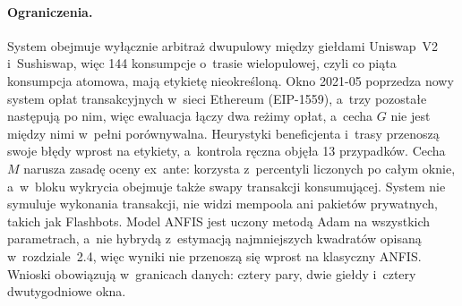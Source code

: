\paragraph{Ograniczenia.} System obejmuje wyłącznie arbitraż dwupulowy między giełdami
Uniswap~V2 i~Sushiswap, więc 144 konsumpcje o~trasie wielopulowej, czyli co piąta konsumpcja
atomowa, mają etykietę nieokreśloną. Okno 2021-05 poprzedza nowy system opłat transakcyjnych
w~sieci Ethereum (EIP-1559), a~trzy pozostałe następują po nim, więc ewaluacja łączy dwa reżimy
opłat, a~cecha $G$ nie jest między nimi w~pełni porównywalna. Heurystyki beneficjenta i~trasy
przenoszą swoje błędy wprost na etykiety, a~kontrola ręczna objęła 13 przypadków. Cecha $M$
narusza zasadę oceny ex~ante: korzysta z~percentyli liczonych po całym oknie, a~w~bloku wykrycia
obejmuje także swapy transakcji konsumującej. System nie symuluje wykonania transakcji, nie widzi
mempoola ani pakietów prywatnych, takich jak Flashbots. Model ANFIS jest uczony metodą Adam na
wszystkich parametrach, a~nie hybrydą z~estymacją najmniejszych kwadratów opisaną
w~rozdziale~2.4, więc wyniki nie przenoszą się wprost na klasyczny ANFIS. Wnioski obowiązują
w~granicach danych: cztery pary, dwie giełdy i~cztery dwutygodniowe okna.
